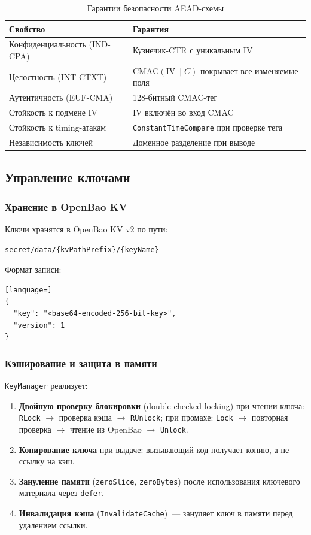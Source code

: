 \documentclass[a4paper,14pt]{extarticle}
\begin{document}
\begin{table}[h]
\centering
\caption{Гарантии безопасности AEAD-схемы}
\begin{tabular}{@{}lp{10cm}@{}}
\toprule
\textbf{Свойство} & \textbf{Гарантия} \\
\midrule
Конфиденциальность (IND-CPA) & Кузнечик-CTR с уникальным IV \\
Целостность (INT-CTXT) & $\mathrm{CMAC}(\mathrm{IV} \| C)$ покрывает все изменяемые поля \\
Аутентичность (EUF-CMA) & 128-битный CMAC-тег \\
Стойкость к подмене IV & IV включён во вход CMAC \\
Стойкость к timing-атакам & \texttt{ConstantTimeCompare} при проверке тега \\
Независимость ключей & Доменное разделение при выводе \\
\bottomrule
\end{tabular}
\end{table}

\subsection{Управление ключами}

\subsubsection{Хранение в OpenBao KV}

Ключи хранятся в OpenBao KV v2 по пути:
\begin{verbatim}
secret/data/{kvPathPrefix}/{keyName}
\end{verbatim}

Формат записи:
\begin{lstlisting}[language=]
{
  "key": "<base64-encoded-256-bit-key>",
  "version": 1
}
\end{lstlisting}

\subsubsection{Кэширование и защита в памяти}

\texttt{KeyManager} реализует:
\begin{enumerate}
    \item \textbf{Двойную проверку блокировки} (double-checked locking) при чтении ключа: \texttt{RLock} $\to$ проверка кэша $\to$ \texttt{RUnlock}; при промахе: \texttt{Lock} $\to$ повторная проверка $\to$ чтение из OpenBao $\to$ \texttt{Unlock}.
    \item \textbf{Копирование ключа} при выдаче: вызывающий код получает копию, а не ссылку на кэш.
    \item \textbf{Зануление памяти} (\texttt{zeroSlice}, \texttt{zeroBytes}) после использования ключевого материала через \texttt{defer}.
    \item \textbf{Инвалидация кэша} (\texttt{InvalidateCache})~--- зануляет ключ в памяти перед удалением ссылки.
\end{enumerate}
\end{document}
